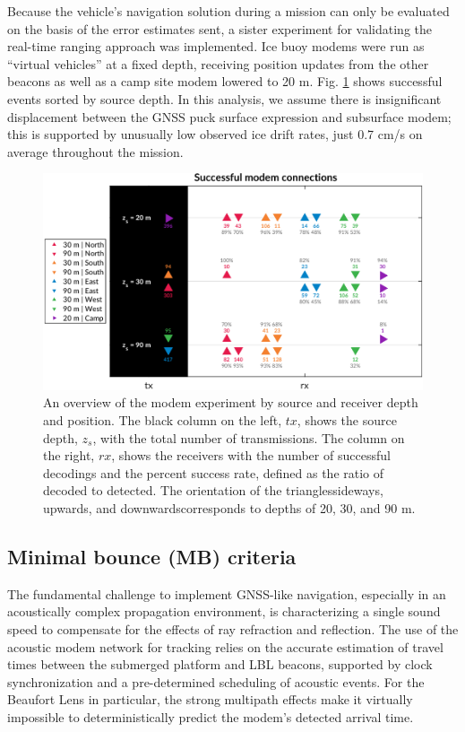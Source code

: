 Because the vehicle's navigation solution during a mission can only be evaluated on the basis of the error estimates sent, a sister experiment for validating the real-time ranging approach was implemented.
Ice buoy modems were run as ``virtual vehicles'' at a fixed depth, receiving position updates from the other beacons as well as a camp site modem lowered to 20 m. 
Fig. \ref{fig:overview} shows successful events sorted by source depth.
In this analysis, we assume there is insignificant displacement between the GNSS puck surface expression and subsurface modem; this is supported by unusually low observed ice drift rates, just 0.7 cm/s on average throughout the mission.

\begin{figure}[h!]
  \centering
  \includegraphics[width=\columnwidth]{figs/modem-chart.pdf}
  \caption{An overview of the modem experiment by source and receiver depth and position. The black column on the left, $tx$, shows the source depth, $z_s$, with the total number of transmissions. The column on the right, $rx$, shows the receivers with the number of successful decodings and the percent success rate, defined as the ratio of decoded to detected. The orientation of the triangles\textemdash sideways, upwards, and downwards\textemdash corresponds to depths of 20, 30, and 90 m.}
  \label{fig:overview}
  \end{figure}

\subsection{Minimal bounce (MB) criteria}

 The fundamental challenge to implement GNSS-like navigation, especially in an acoustically complex propagation environment, is characterizing a single sound speed to compensate for the effects of ray refraction and reflection.
The use of the acoustic modem network for tracking relies on the accurate estimation of travel times between the submerged platform and LBL beacons, supported by clock synchronization and a pre-determined scheduling of acoustic events.
 For the Beaufort Lens in particular, the strong multipath effects make it virtually impossible to deterministically predict the modem's detected arrival time.

